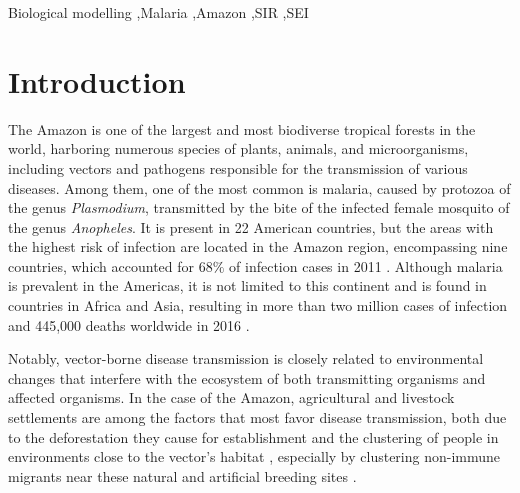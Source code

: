 \documentclass[a4paper,fleqn]{cas-dc}
\begin{document}





\begin{keywords}
Biological modelling \sep Malaria \sep Amazon \sep SIR \sep SEI
\end{keywords}


\maketitle

\section{Introduction}

The Amazon is one of the largest and most biodiverse tropical forests 
in the world, harboring numerous species of plants, animals, and 
microorganisms, including vectors and pathogens responsible for the 
transmission of various diseases. Among them, one of the most common 
is malaria, caused by protozoa of the genus \textit{Plasmodium}, 
transmitted by the bite of the infected female mosquito of the genus 
\textit{Anopheles}. It is present in 22 American countries, but the 
areas with the highest risk of infection are located in the Amazon 
region, encompassing nine countries, which accounted for $68\%$ of 
infection cases in 
2011 \cite{pimenta_orfano_bahia_duarte_rios-velasquez_melo_pessoa_oliveira_campos_villegas_etal_2015}. 
Although malaria is prevalent in the Americas, it is 
not limited to this continent and is found in countries in Africa and Asia, 
resulting in more than two million cases of infection and 445,000 deaths 
worldwide in 2016 \cite{regulation_of_sexual_commitment}.

Notably, vector-borne disease transmission is closely related to 
environmental changes that interfere with the ecosystem of both 
transmitting organisms and affected organisms. In the case of the 
Amazon, agricultural and livestock settlements are among the factors
that most favor disease transmission, both due to the deforestation 
they cause for establishment and the clustering of people in environments 
close to the vector's habitat \cite{silva-nunes_malaria_amazon_2008}, 
especially by clustering non-immune migrants near these natural and 
artificial breeding sites \cite{DASILVANUNES2012281}.
\end{document}
